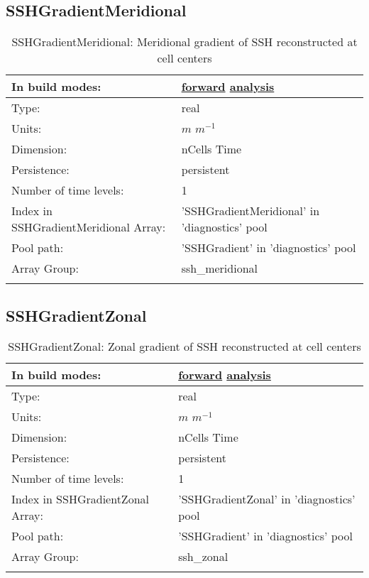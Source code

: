\subsection[SSHGradientMeridional]{SSHGradientMeridional}
\label{subsec:var_sec_diagnostics_SSHGradientMeridional}
\begin{center}
\begin{longtable}{| p{2.0in} | p{4.0in} |}
        \hline 
        In build modes: & \hyperref[subsec:forward_var_tab_diagnostics]{forward} \hyperref[subsec:analysis_var_tab_diagnostics]{analysis} \\
        \hline 
        Type: & real \\
        \hline 
        Units: & $m$ $m^{-1}$ \\
        \hline 
        Dimension: & nCells Time \\
        \hline 
        Persistence: & persistent \\
        \hline 
        Number of time levels: & 1 \\
        \hline 
		 Index in SSHGradientMeridional Array: & 'SSHGradientMeridional' in 'diagnostics' pool \\
		 \hline 
            Pool path: & 'SSHGradient' in 'diagnostics' pool
 \\
		 \hline 
		 Array Group: & ssh\_meridional \\
		 \hline 
    \caption{SSHGradientMeridional: Meridional gradient of SSH reconstructed at cell centers}
\end{longtable}
\end{center}
\subsection[SSHGradientZonal]{SSHGradientZonal}
\label{subsec:var_sec_diagnostics_SSHGradientZonal}
\begin{center}
\begin{longtable}{| p{2.0in} | p{4.0in} |}
        \hline 
        In build modes: & \hyperref[subsec:forward_var_tab_diagnostics]{forward} \hyperref[subsec:analysis_var_tab_diagnostics]{analysis} \\
        \hline 
        Type: & real \\
        \hline 
        Units: & $m$ $m^{-1}$ \\
        \hline 
        Dimension: & nCells Time \\
        \hline 
        Persistence: & persistent \\
        \hline 
        Number of time levels: & 1 \\
        \hline 
		 Index in SSHGradientZonal Array: & 'SSHGradientZonal' in 'diagnostics' pool \\
		 \hline 
            Pool path: & 'SSHGradient' in 'diagnostics' pool
 \\
		 \hline 
		 Array Group: & ssh\_zonal \\
		 \hline 
    \caption{SSHGradientZonal: Zonal gradient of SSH reconstructed at cell centers}
\end{longtable}
\end{center}
